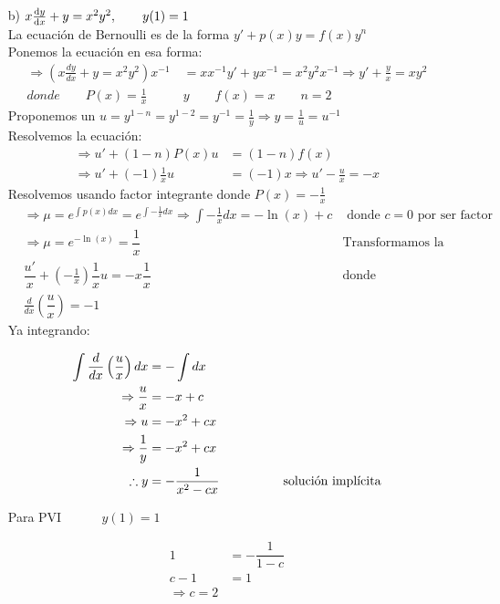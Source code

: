 \begin{itemize}
       \item[b)] $x \dv{y}{x} +y = x^{2}y^{2}, \qquad y(1)=1$\\
       La ecuación de Bernoulli es de la forma $y'+p(x)y=f(x)y^n$\\
       Ponemos la ecuación en esa forma:
       \begin{align*}
           \Rightarrow \left(x\frac{dy}{dx}+y=x^2y^2\right)x^{-1} &= xx^{-1}y'+yx^{-1}=x^2y^2x^{-1} \Rightarrow y'+\frac{y}{x}=xy^2\\
           donde \qquad P(x)=\frac{1}{x} \qquad &y \qquad f(x)=x \qquad n=2
       \end{align*}
       Proponemos un $u=y^{1-n}=y^{1-2}=y^{-1}=\frac{1}{y} \Rightarrow y=\frac{1}{u}=u^{-1}$\\
       Resolvemos la ecuación:
       \begin{align*}
           \Rightarrow u'+(1-n)P(x)u &= (1-n)f(x)\\
           \Rightarrow u'+(-1)\frac{1}{x}u &= (-1)x \Rightarrow u'-\frac{u}{x}=-x
       \end{align*}
       Resolvemos usando factor integrante donde $P(x)=-\frac{1}{x}$
       \begin{align*}
           &\Rightarrow \mu = e^{\int p(x)dx}=e^{\int-\frac{1}{x}dx} \Rightarrow \int -\frac{1}{x}dx=-\ln(x)+c
           & \text{ donde $c=0$ por ser factor integrante}\\
           &\Rightarrow \mu= e^{-\ln(x)} = \dfrac{1}{x}
           & \text{Transformamos la ecuación:} \\
           &\dfrac{u'}{x}+\left(-\frac{1}{x}\right) \dfrac{1}{x} u=-x \dfrac{1}{x}
           & \text{donde} \\
           &\frac{d}{dx}\left( \dfrac{u}{x}\right) =-1
       \end{align*}
       Ya integrando:
       
       \begin{align*}
           \int \dfrac{d}{dx}\left( \dfrac{u}{x} \right) dx &= -\int dx \\
           \Rightarrow\dfrac{u}{x}&=-x+c\\
           \Rightarrow u &= -x^2 +cx \\ 
           \Rightarrow \dfrac{1}{y}&= -x^2 +cx \\ 
           \therefore y &= -\dfrac{1}{x^2-cx} ~~~~~~~~~~~~~~~ \text{solución implícita}
       \end{align*}
       
       Para PVI ~~~~~ $y(1)=1$
       
       \begin{align*}
           1&=-\dfrac{1}{1-c}\\
           c-1&=1 \\
           \Rightarrow c=2
       \end{align*}
      
       
       \begin{center}
       \end{center}
       \end{itemize}